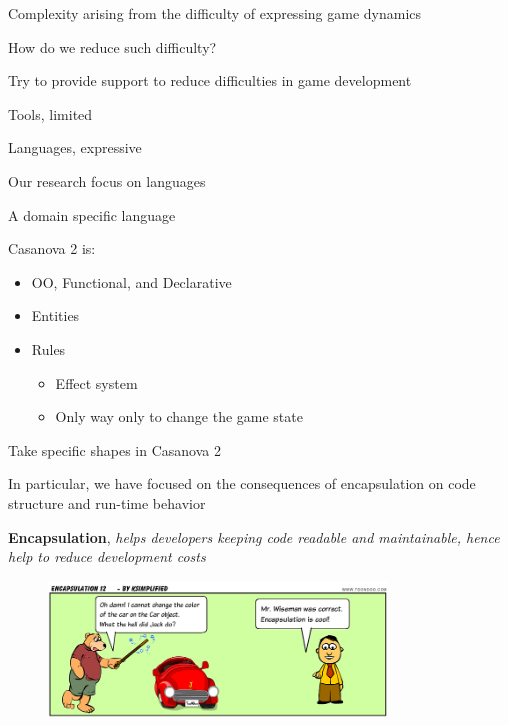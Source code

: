 \documentclass{beamer}
\begin{document}
\begin{slide}{
\item Complexity arising from the difficulty of expressing game dynamics
\pause
\item How do we reduce such difficulty?
}\end{slide}

\begin{slide}{
\item Try to provide support to reduce difficulties in game development
\pause
\item Tools, limited
\item Languages, expressive
\pause
\item Our research focus on languages
}\end{slide}

\begin{slide}{
\item A domain specific language
\pause
\item Casanova 2 is:
\begin{itemize}
\item OO, Functional, and Declarative
\item Entities
\item Rules
\begin{itemize}
\item Effect system
\item Only way only to change the game state
\end{itemize}
\end{itemize}
}\end{slide}


\begin{slide}{
\item Take specific shapes in Casanova 2
\pause
\item In particular, we have focused on the consequences of encapsulation on code structure and run-time behavior
\pause
\item[]
\item \textbf{Encapsulation}, \textit{helps developers keeping code readable and maintainable, hence help to reduce development costs}
\item[]
\centering
\begin{figure}
\includegraphics[width = 0.8\textwidth]{Figures/encapsulation-12}
\end{figure}
}\end{slide}
\end{document}
